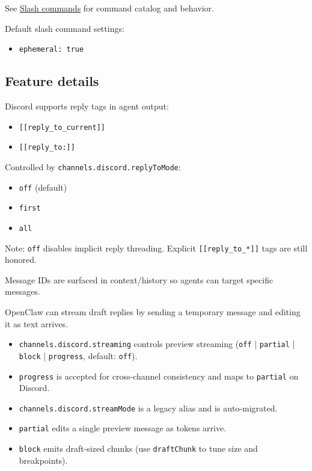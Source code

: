 See \href{/tools/slash-commands}{Slash commands} for command catalog and behavior.

Default slash command settings:

\begin{itemize}
  \item \texttt{ephemeral: true}
\end{itemize}


\subsection{Feature details}


Discord supports reply tags in agent output:

\begin{itemize}
  \item \texttt{[[reply\_to\_current]]}
  \item \texttt{[[reply\_to:]]}
\end{itemize}


Controlled by \texttt{channels.discord.replyToMode}:

\begin{itemize}
  \item \texttt{off} (default)
  \item \texttt{first}
  \item \texttt{all}
\end{itemize}


Note: \texttt{off} disables implicit reply threading. Explicit \texttt{[[reply\_to\_*]]} tags are still honored.

Message IDs are surfaced in context/history so agents can target specific messages.


OpenClaw can stream draft replies by sending a temporary message and editing it as text arrives.

\begin{itemize}
  \item \texttt{channels.discord.streaming} controls preview streaming (\texttt{off} | \texttt{partial} | \texttt{block} | \texttt{progress}, default: \texttt{off}).
  \item \texttt{progress} is accepted for cross-channel consistency and maps to \texttt{partial} on Discord.
  \item \texttt{channels.discord.streamMode} is a legacy alias and is auto-migrated.
  \item \texttt{partial} edits a single preview message as tokens arrive.
  \item \texttt{block} emits draft-sized chunks (use \texttt{draftChunk} to tune size and breakpoints).
\end{itemize}



